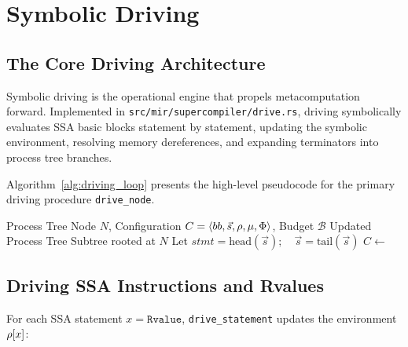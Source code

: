 \chapter{Symbolic Driving}
\label{chap:driving}

\section{The Core Driving Architecture}
\label{sec:driving:arch}

Symbolic driving is the operational engine that propels metacomputation forward. Implemented in \texttt{src/mir/supercompiler/drive.rs}, driving symbolically evaluates SSA basic blocks statement by statement, updating the symbolic environment, resolving memory dereferences, and expanding terminators into process tree branches.

Algorithm~\ref{alg:driving_loop} presents the high-level pseudocode for the primary driving procedure \texttt{drive\_node}.

\begin{algorithm}[h!]
\caption{The NumLang Symbolic Driving Loop (\texttt{drive\_node})}
\label{alg:driving_loop}
\begin{algorithmic}[1]
\Require Process Tree Node $N$, Configuration $C = \langle bb, \vec{s}, \rho, \mu, \Phi \rangle$, Budget $\mathcal{B}$
\Ensure Updated Process Tree Subtree rooted at $N$
        \State \Return {}
    \EndIf
        \State \Return {}
    \EndIf
        \State Let $stmt = \text{head}(\vec{s}); \quad \vec{s} = \text{tail}(\vec{s})$
        \State $C \gets$ 
    \EndWhile
    \State \Return {}
\EndProcedure
\end{algorithmic}
\end{algorithm}

\section{Driving SSA Instructions and Rvalues}
\label{sec:driving:instructions}

For each SSA statement $x = \mathtt{Rvalue}$, \texttt{drive\_statement} updates the environment $\rho[x]$:

